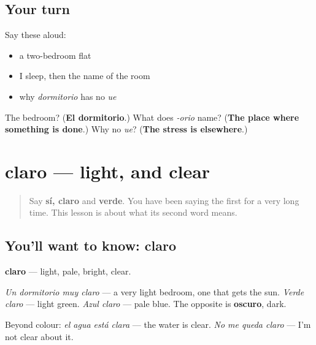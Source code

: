 \subsection*{Your turn}
Say these aloud:

\begin{itemize}
\raggedright
  \item a two-bedroom flat
  \item I sleep, then the name of the room
  \item why \emph{dormitorio} has no \emph{ue}
\end{itemize}

\begin{tcolorbox}[breakable,colback=teal!4,colframe=teal!35!black,title={Before you move on}]
The bedroom? (\textbf{El dormitorio}.) What does \emph{-orio} name? (\textbf{The place where something is done}.) Why no \emph{ue}? (\textbf{The stress is elsewhere}.)
\end{tcolorbox}
\section[claro]{claro — light, and clear}

\label{lesson:ES-C455-claro}



\begin{quote}
Say \textbf{sí, claro} and \textbf{verde}. You have been saying the first for a very long time. This lesson is about what its second word means.
\end{quote}

\subsection*{You'll want to know: claro}
\textbf{claro} — light, pale, bright, clear.

\emph{Un dormitorio muy claro} — a very light bedroom, one that gets the sun. \emph{Verde claro} — light green. \emph{Azul claro} — pale blue. The opposite is \textbf{oscuro}, dark.

Beyond colour: \emph{el agua está clara} — the water is clear. \emph{No me queda claro} — I'm not clear about it.

